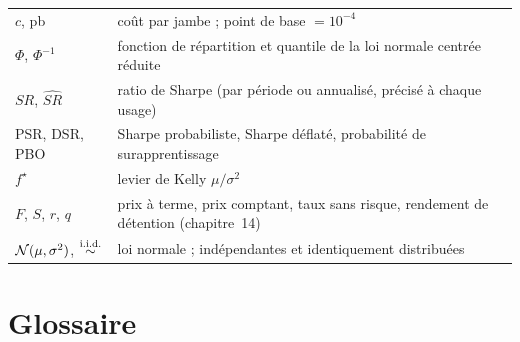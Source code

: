 \begin{center}
\begin{longtable}{>{\raggedright}p{3.2cm}>{\raggedright\arraybackslash}p{10.6cm}}
$c$, pb & coût par jambe ; point de base $=10^{-4}$ \\
$\Phi$, $\Phi^{-1}$ & fonction de répartition et quantile de la loi normale centrée réduite \\
$SR$, $\widehat{SR}$ & ratio de Sharpe (par période ou annualisé, précisé à chaque usage) \\
PSR, DSR, PBO & Sharpe probabiliste, Sharpe déflaté, probabilité de surapprentissage \\
$f^\star$ & levier de Kelly $\mu/\sigma^2$ \\
$F$, $S$, $r$, $q$ & prix à terme, prix comptant, taux sans risque, rendement de détention (chapitre~14) \\
$\mathcal{N}(\mu,\sigma^2)$, $\overset{\text{i.i.d.}}{\sim}$ & loi normale ; indépendantes et identiquement distribuées \\
\bottomrule
\end{longtable}
\end{center}

\chapter{Glossaire}
\label{ann:glossaire}

